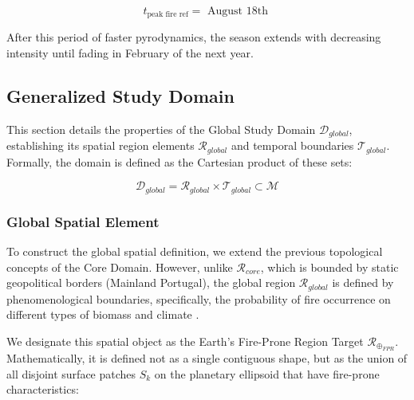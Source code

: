 \begin{table}[ht]
{\begin{equation}

    t_{\text{peak fire ref}} = \text{ August 18th }

    \label{eq:peak_fire_ref_day}

\end{equation}

After this period of faster pyrodynamics, the season extends with decreasing intensity until fading in February of the next year. 



\subsection{Generalized Study Domain}



This section details the properties of the Global Study Domain $\mathcal{D}_{global}$, establishing its spatial region elements $\mathcal{R}_{global}$ and temporal boundaries $\mathcal{T}_{global}$. Formally, the domain is defined as the Cartesian product of these sets:

\begin{equation}

    \mathcal{D}_{global} = \mathcal{R}_{global} \times \mathcal{T}_{global} \subset \mathcal{M}

\end{equation}



\subsubsection{Global Spatial Element}



To construct the global spatial definition, we extend the previous topological concepts of the Core Domain. However, unlike $\mathcal{R}_{core}$, which is bounded by static geopolitical borders (Mainland Portugal), the global region $\mathcal{R}_{global}$ is defined by phenomenological boundaries, specifically, the probability of fire occurrence on different types of biomass and climate .



We designate this spatial object as the Earth's Fire-Prone Region Target\textbf{ $\mathcal{R}_{\oplus_{FPR}}$}. Mathematically, it is defined not as a single contiguous shape, but as the union of all disjoint surface patches $S_k$ on the planetary ellipsoid that have fire-prone characteristics:



}
\end{table}
